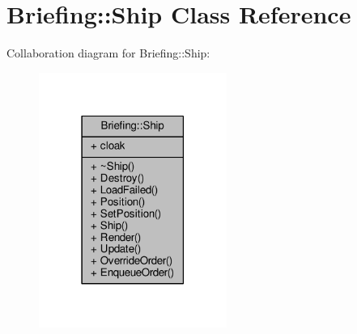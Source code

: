 \hypertarget{classBriefing_1_1Ship}{}\section{Briefing\+:\+:Ship Class Reference}
\label{classBriefing_1_1Ship}


Collaboration diagram for Briefing\+:\+:Ship\+:
\nopagebreak
\begin{figure}[H]
\begin{center}
\leavevmode
\includegraphics[width=174pt]{d4/df0/classBriefing_1_1Ship__coll__graph}
\end{center}
\end{figure}
